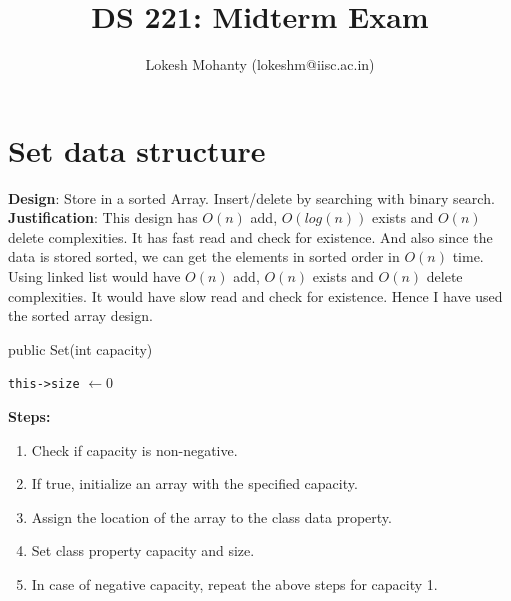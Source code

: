 \documentclass{article}
\title{DS 221: Midterm Exam}
\author{Lokesh Mohanty (lokeshm@iisc.ac.in)}
\begin{document}
\maketitle

\section{Set data structure}
\label{sec:1}

\textbf{Design}: Store in a sorted Array. Insert/delete by searching with binary search.\\
\textbf{Justification}:
This design has $O(n)$ add, $O(log(n))$ exists and $O(n)$ delete complexities. It has fast read and check for existence. And also since the data is stored sorted, we can get the elements in sorted order in $O(n)$ time. Using linked list would have $O(n)$ add, $O(n)$ exists and $O(n)$ delete complexities. It would have slow read and check for existence. Hence I have used the sorted array design.


\begin{algorithm}[H]
  \caption{public Set(int capacity)}\label{alg:1.1}
  \DontPrintSemicolon
  \verb~this->size~ $\gets 0$\;
\end{algorithm}
\textbf{Steps:}
\begin{enumerate}
\item Check if capacity is non-negative.
\item If true, initialize an array with the specified capacity.
\item Assign the location of the array to the class data property.
\item Set class property capacity and size.
\item In case of negative capacity, repeat the above steps for capacity 1.
\end{enumerate}
\end{document}
